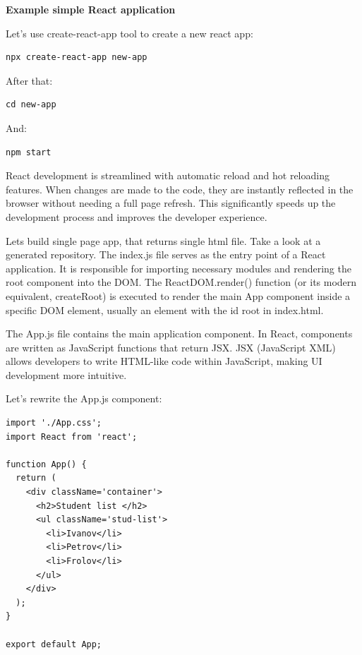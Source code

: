 \medskip

\textbf{Example simple React application}

\medskip

Let's use create-react-app tool to create a new react app:

\begin{lstlisting}
npx create-react-app new-app
\end{lstlisting}

After that:

\begin{lstlisting}
cd new-app
\end{lstlisting}

And:

\begin{lstlisting}
npm start
\end{lstlisting}

React development is streamlined with automatic reload and hot reloading features. When changes are made to the code, they are instantly reflected in the browser without needing a full page refresh. This significantly speeds up the development process and improves the developer experience.

Lets build single page app, that returns single html file. Take a look at a generated repository.
The index.js file serves as the entry point of a React application. It is responsible for importing necessary modules and rendering the root component into the DOM.
The ReactDOM.render() function (or its modern equivalent, createRoot) is executed to render the main App component inside a specific DOM element, usually an element with the id root in index.html.

The App.js file contains the main application component. In React, components are written as JavaScript functions that return JSX. JSX (JavaScript XML) allows developers to write HTML-like code within JavaScript, making UI development more intuitive.


Let's rewrite the App.js component:

\begin{lstlisting}
import './App.css';
import React from 'react';

function App() {
  return (
    <div className='container'>
      <h2>Student list </h2>
      <ul className='stud-list'>
        <li>Ivanov</li>
        <li>Petrov</li>
        <li>Frolov</li>
      </ul>
    </div>
  );
}

export default App;
\end{lstlisting}

